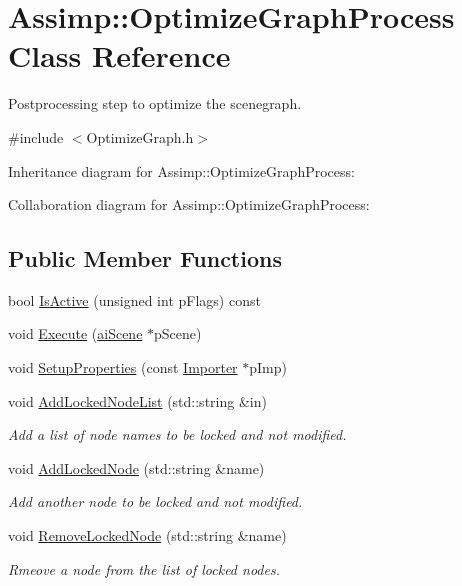 \hypertarget{class_assimp_1_1_optimize_graph_process}{\section{Assimp\+:\+:Optimize\+Graph\+Process Class Reference}
\label{class_assimp_1_1_optimize_graph_process}
}


Postprocessing step to optimize the scenegraph.  




{\ttfamily \#include $<$Optimize\+Graph.\+h$>$}



Inheritance diagram for Assimp\+:\+:Optimize\+Graph\+Process\+:


Collaboration diagram for Assimp\+:\+:Optimize\+Graph\+Process\+:
\subsection*{Public Member Functions}
\begin{DoxyCompactItemize}
\item 
bool \hyperlink{class_assimp_1_1_optimize_graph_process_aa69c8d18557a7a0d74d5780506a7657b}{Is\+Active} (unsigned int p\+Flags) const 
\item 
void \hyperlink{class_assimp_1_1_optimize_graph_process_ab21a050103981549e7d54cc2b837bbb4}{Execute} (\hyperlink{structai_scene}{ai\+Scene} $\ast$p\+Scene)
\item 
void \hyperlink{class_assimp_1_1_optimize_graph_process_a59a571c02b8ce7fcebf0e2bf29f97aa9}{Setup\+Properties} (const \hyperlink{class_assimp_1_1_importer}{Importer} $\ast$p\+Imp)
\item 
void \hyperlink{class_assimp_1_1_optimize_graph_process_a3c395f1c3de25cf617faffea3f3ef421}{Add\+Locked\+Node\+List} (std\+::string \&in)
\begin{DoxyCompactList}\small\item\em Add a list of node names to be locked and not modified. \end{DoxyCompactList}\item 
void \hyperlink{class_assimp_1_1_optimize_graph_process_a0aa8b921906b6bd9a1c678ec57c2812e}{Add\+Locked\+Node} (std\+::string \&name)
\begin{DoxyCompactList}\small\item\em Add another node to be locked and not modified. \end{DoxyCompactList}\item 
void \hyperlink{class_assimp_1_1_optimize_graph_process_afc4dfabc85e9db5e72f337cc976afbda}{Remove\+Locked\+Node} (std\+::string \&name)
\begin{DoxyCompactList}\small\item\em Rmeove a node from the list of locked nodes. \end{DoxyCompactList}\end{DoxyCompactItemize}
